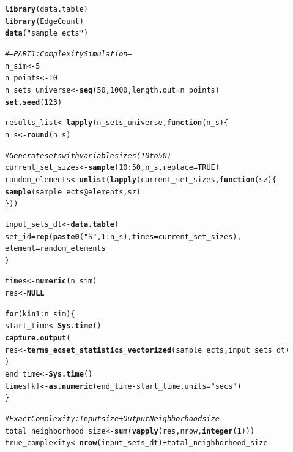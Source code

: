 \documentclass{article}\usepackage[]{graphicx}\usepackage[]{xcolor}
\makeatletter
\newcommand{\hlnum}[1]{\textcolor[rgb]{0.686,0.059,0.569}{#1}}%
\newcommand{\hlsng}[1]{\textcolor[rgb]{0.192,0.494,0.8}{#1}}%
\newcommand{\hlcom}[1]{\textcolor[rgb]{0.678,0.584,0.686}{\textit{#1}}}%
\newcommand{\hlopt}[1]{\textcolor[rgb]{0,0,0}{#1}}%
\newcommand{\hldef}[1]{\textcolor[rgb]{0.345,0.345,0.345}{#1}}%
\newcommand{\hlkwa}[1]{\textcolor[rgb]{0.161,0.373,0.58}{\textbf{#1}}}%
\newcommand{\hlkwb}[1]{\textcolor[rgb]{0.69,0.353,0.396}{#1}}%
\newcommand{\hlkwc}[1]{\textcolor[rgb]{0.333,0.667,0.333}{#1}}%
\newcommand{\hlkwd}[1]{\textcolor[rgb]{0.737,0.353,0.396}{\textbf{#1}}}%
\newenvironment{kframe}{%
 \def\at@end@of@kframe{}%
 \ifinner\ifhmode%
  \def\at@end@of@kframe{\end{minipage}}%
  \begin{minipage}{\columnwidth}%
 \fi\fi%
 \def\FrameCommand##1{\hskip\@totalleftmargin \hskip-\fboxsep
 \colorbox{shadecolor}{##1}\hskip-\fboxsep
     \hskip-\linewidth \hskip-\@totalleftmargin \hskip\columnwidth}%
 \MakeFramed {\advance\hsize-\width
   \@totalleftmargin\z@ \linewidth\hsize
   \@setminipage}}%
 {\par\unskip\endMakeFramed%
 \at@end@of@kframe}
\newenvironment{knitrout}{}{} %
\makeatother
\begin{document}
\begin{knitrout}
\color{fgcolor}\begin{kframe}
\begin{alltt}
\hlkwd{library}\hldef{(data.table)}
\hlkwd{library}\hldef{(EdgeCount)}
\hlkwd{data}\hldef{(}\hlsng{"sample_ects"}\hldef{)}

\hlcom{# --- PART 1: Complexity Simulation ---}
\hldef{n_sim} \hlkwb{<-} \hlnum{5}
\hldef{n_points} \hlkwb{<-} \hlnum{10}
\hldef{n_sets_universe} \hlkwb{<-} \hlkwd{seq}\hldef{(}\hlnum{50}\hldef{,} \hlnum{1000}\hldef{,} \hlkwc{length.out} \hldef{= n_points)}
\hlkwd{set.seed}\hldef{(}\hlnum{123}\hldef{)}

\hldef{results_list} \hlkwb{<-} \hlkwd{lapply}\hldef{(n_sets_universe,} \hlkwa{function}\hldef{(}\hlkwc{n_s}\hldef{)\{}
  \hldef{n_s} \hlkwb{<-} \hlkwd{round}\hldef{(n_s)}

  \hlcom{# Generate sets with variable sizes (10 to 50)}
  \hldef{current_set_sizes} \hlkwb{<-} \hlkwd{sample}\hldef{(}\hlnum{10}\hlopt{:}\hlnum{50}\hldef{, n_s,} \hlkwc{replace} \hldef{=} \hlnum{TRUE}\hldef{)}
  \hldef{random_elements} \hlkwb{<-} \hlkwd{unlist}\hldef{(}\hlkwd{lapply}\hldef{(current_set_sizes,} \hlkwa{function}\hldef{(}\hlkwc{sz}\hldef{) \{}
    \hlkwd{sample}\hldef{(sample_ects}\hlopt{@}\hlkwc{elements}\hldef{, sz)}
  \hldef{\}))}

  \hldef{input_sets_dt} \hlkwb{<-} \hlkwd{data.table}\hldef{(}
    \hlkwc{set_id} \hldef{=} \hlkwd{rep}\hldef{(}\hlkwd{paste0}\hldef{(}\hlsng{"S"}\hldef{,} \hlnum{1}\hlopt{:}\hldef{n_s),} \hlkwc{times} \hldef{= current_set_sizes),}
    \hlkwc{element} \hldef{= random_elements}
  \hldef{)}

  \hldef{times} \hlkwb{<-} \hlkwd{numeric}\hldef{(n_sim)}
  \hldef{res} \hlkwb{<-} \hlkwa{NULL}

  \hlkwa{for}\hldef{(k} \hlkwa{in} \hlnum{1}\hlopt{:}\hldef{n_sim)\{}
    \hldef{start_time} \hlkwb{<-} \hlkwd{Sys.time}\hldef{()}
    \hlkwd{capture.output}\hldef{(}
      \hldef{res} \hlkwb{<-} \hlkwd{terms_ecset_statistics_vectorized}\hldef{(sample_ects, input_sets_dt)}
    \hldef{)}
    \hldef{end_time} \hlkwb{<-} \hlkwd{Sys.time}\hldef{()}
    \hldef{times[k]} \hlkwb{<-} \hlkwd{as.numeric}\hldef{(end_time} \hlopt{-} \hldef{start_time,} \hlkwc{units} \hldef{=} \hlsng{"secs"}\hldef{)}
  \hldef{\}}

  \hlcom{# Exact Complexity: Input size + Output Neighborhood size}
  \hldef{total_neighborhood_size} \hlkwb{<-} \hlkwd{sum}\hldef{(}\hlkwd{vapply}\hldef{(res, nrow,} \hlkwd{integer}\hldef{(}\hlnum{1}\hldef{)))}
  \hldef{true_complexity} \hlkwb{<-} \hlkwd{nrow}\hldef{(input_sets_dt)} \hlopt{+} \hldef{total_neighborhood_size}


\end{alltt}
\end{kframe}
\end{knitrout}
\end{document}
